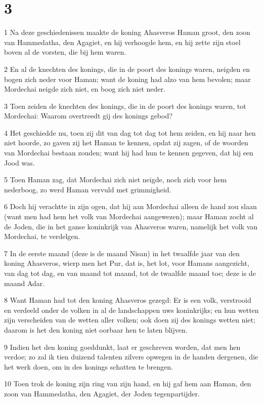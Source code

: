 \chapter{3}

\par 1 Na deze geschiedenissen maakte de koning Ahasveros Haman groot, den zoon van Hammedatha, den Agagiet, en hij verhoogde hem, en hij zette zijn stoel boven al de vorsten, die bij hem waren.
\par 2 En al de knechten des konings, die in de poort des konings waren, neigden en bogen zich neder voor Haman; want de koning had alzo van hem bevolen; maar Mordechai neigde zich niet, en boog zich niet neder.
\par 3 Toen zeiden de knechten des konings, die in de poort des konings waren, tot Mordechai: Waarom overtreedt gij des konings gebod?
\par 4 Het geschiedde nu, toen zij dit van dag tot dag tot hem zeiden, en hij naar hen niet hoorde, zo gaven zij het Haman te kennen, opdat zij zagen, of de woorden van Mordechai bestaan zouden; want hij had hun te kennen gegeven, dat hij een Jood was.
\par 5 Toen Haman zag, dat Mordechai zich niet neigde, noch zich voor hem nederboog, zo werd Haman vervuld met grimmigheid.
\par 6 Doch hij verachtte in zijn ogen, dat hij aan Mordechai alleen de hand zou slaan (want men had hem het volk van Mordechai aangewezen); maar Haman zocht al de Joden, die in het ganse koninkrijk van Ahasveros waren, namelijk het volk van Mordechai, te verdelgen.
\par 7 In de eerste maand (deze is de maand Nisan) in het twaalfde jaar van den koning Ahasveros, wierp men het Pur, dat is, het lot, voor Hamans aangezicht, van dag tot dag, en van maand tot maand, tot de twaalfde maand toe; deze is de maand Adar.
\par 8 Want Haman had tot den koning Ahasveros gezegd: Er is een volk, verstrooid en verdeeld onder de volken in al de landschappen uws koninkrijks; en hun wetten zijn verscheiden van de wetten aller volken; ook doen zij des konings wetten niet; daarom is het den koning niet oorbaar hen te laten blijven.
\par 9 Indien het den koning goeddunkt, laat er geschreven worden, dat men hen verdoe; zo zal ik tien duizend talenten zilvers opwegen in de handen dergenen, die het werk doen, om in des konings schatten te brengen.
\par 10 Toen trok de koning zijn ring van zijn hand, en hij gaf hem aan Haman, den zoon van Hammedatha, den Agagiet, der Joden tegenpartijder.
